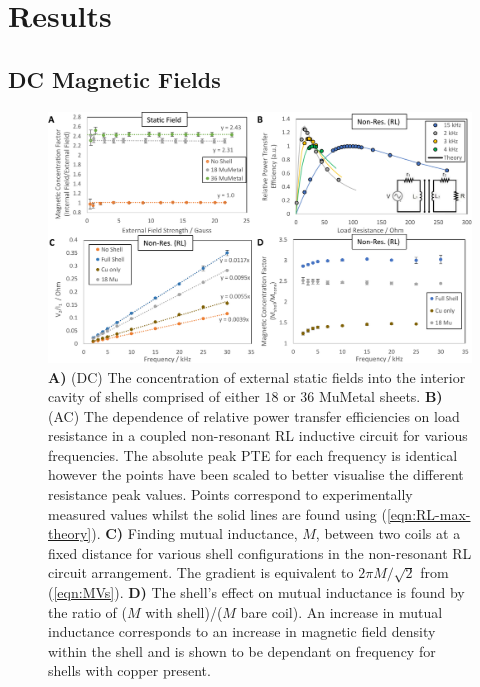 \documentclass[11pt]{iopart}
\begin{document}
\section{Results}
\subsection{DC Magnetic Fields}

\begin{figure}
  \begin{center}
   \noindent\includegraphics[width=0.95\linewidth]{images/compoundRL-error.pdf}
  \end{center}
  \caption{
    \textbf{A)} (DC) The concentration of external static fields into
    the interior cavity of shells comprised of either $18$ or $36$
    MuMetal sheets.
    \textbf{B)} (AC) The dependence of relative power transfer
    efficiencies on load resistance in a coupled non-resonant RL
    inductive circuit for various frequencies. The absolute peak PTE
    for each frequency is identical however the points have been
    scaled to better visualise the different resistance peak
    values. Points correspond to experimentally measured values whilst
    the solid lines are found
    using (\ref{eqn:RL-max-theory}).
    \textbf{C)} Finding mutual inductance, $M$, between two coils at a
    fixed distance for various shell configurations in the non-resonant RL circuit
    arrangement.  The gradient is equivalent to $2\pi M/\sqrt{2}$
    from (\ref{eqn:MVs}).
    \textbf{D)} The shell's effect on mutual inductance is found by the
    ratio of ($M$ with shell)/($M$ bare coil). An increase in mutual
    inductance corresponds to an increase in magnetic field density
    within the shell and is shown to be dependant on frequency for
    shells with copper present.}
  \label{fig:DC_RL}
  \vspace{-0.7em}
\end{figure}
\end{document}
